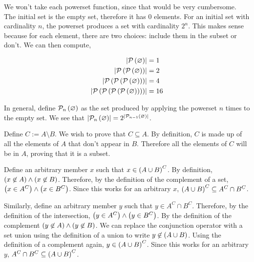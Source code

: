\documentclass{article}
\begin{document}
We won't take each powerset function, since that would be very cumbersome.
The initial set is the empty set, therefore it has 0 elements.
For an initial set with cardinality $n$, the powerset produces a set with cardinality $2^n$.
This makes sense because for each element, there are two choices: include them in the subset or don't.
We can then compute,

\begin{align*}
  \left\lvert\mathcal{P \left (\varnothing \right)} \right\rvert &= 1 \\
  \left\lvert\mathcal{P} \left (\mathcal{P} \left (\varnothing \right) \right)  \right\rvert &= 2 \\
  \left\lvert\mathcal{P} \left (\mathcal{P} \left (\mathcal{P} \left (\varnothing \right) \right) \right) \right\rvert &= 4 \\
  \left\lvert\mathcal{P} \left (\mathcal{P} \left (\mathcal{P} \left (\mathcal{P} \left (\varnothing \right) \right) \right) \right) \right\rvert &= 16 \\
\end{align*}

In general, define $\mathcal{P}_n \left (\varnothing \right)$ as the set produced by applying the powerset $n$ times to the empty set.
We see that $\left\lvert\mathcal{P}_n \left (\varnothing \right) \right\rvert = 2^{\left\lvert\mathcal{P}_{n-1} \left (\varnothing \right) \right\rvert}$.


\problem

Define $C := A \setminus B$.
We wish to prove that $C \subseteq A$.
By definition, $C$ is made up of all the elements of $A$ that don't appear in $B$.
Therefore all the elements of $C$ will be in $A$, proving that it is a subset.


Define an arbitrary member $x$ such that $x \in \left (A\cup B \right)^C$.
By definition, $\left (x \not \in A \right) \land \left (x \not \in B \right)$.
Therefore, by the definition of the complement of a set, $\left (x \in A^C \right) \land \left (x \in B^C \right)$.
Since this works for an arbitrary $x$, $\left (A\cup B \right)^C \subseteq A^C \cap B^C$.

Similarly, define an arbitrary member $y$ such that $y \in A^C \cap B^C$.
Therefore, by the definition of the intersection, $\left (y \in A^C \right) \land \left (y \in B^C \right)$.
By the definition of the complement $\left (y \not \in A \right) \land \left (y \not \in B \right)$.
We can replace the conjunction operator with a set union using the definition of a union to write $y \not \in \left (A \cup B \right)$.
Using the definition of a complement again, $y \in \left (A \cup B \right)^C$.
Since this works for an arbitrary $y$, $A^C \cap B^C \subseteq \left (A\cup B \right)^C$.
\end{document}
